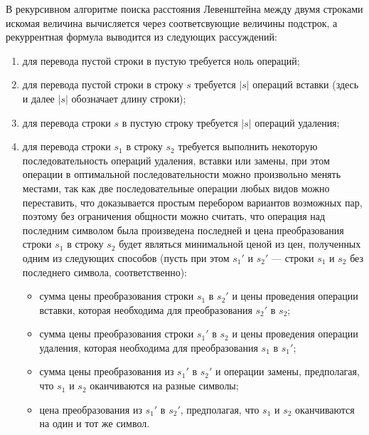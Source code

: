 В рекурсивном алгоритме поиска расстояния Левенштейна между двумя строками
искомая величина вычисляется через соответсвующие величины подстрок, а
рекуррентная формула выводится из следующих рассуждений:
\begin{enumerate}[label=\arabic*)]
    \item для перевода пустой строки в пустую требуется ноль операций; 
    \item для перевода пустой строки в строку $s$ требуется $|s|$ операций
вставки (здесь и далее $|s|$ обозначает длину строки);
    \item для перевода строки $s$ в пустую строку требуется $|s|$ операций
удаления;
    \item для перевода строки $s_1$ в строку $s_2$ требуется выполнить
некоторую последовательность операций удаления, вставки или замены, при этом
операции в оптимальной последовательности можно произвольно менять местами, так
как две последовательные операции любых видов можно переставить, что
доказывается простым перебором вариантов возможных пар, поэтому без ограничения
общности можно считать, что операция над последним символом была произведена
последней и цена преобразования строки $s_1$ в строку $s_2$ будет являться
минимальной ценой из цен, полученных одним из следующих способов (пусть
при этом $s_1'$ и $s_2'$ --- строки $s_1$ и $s_2$ без последнего символа,
соответственно):
        \begin{itemize}[itemindent=\parindent,leftmargin=\parindent]
            \item сумма цены преобразования строки $s_1$ в $s_2'$  и цены
        проведения операции вставки, которая необходима для преобразования $s_2'$
        в $s_2$;
            \item сумма цены преобразования строки $s_1'$ в $s_2$ и цены проведения
        операции удаления, которая необходима для преобразования $s_1$ в $s_1'$;
            \item сумма цены преобразования из $s_1'$ в $s_2'$ и операции замены,
        предполагая, что $s_1$ и $s_2$ оканчиваются на разные символы;
            \item цена преобразования из $s_1'$ в $s_2'$, предполагая, что $s_1$ и
        $s_2$ оканчиваются на один и тот же символ.
        \end{itemize}
\end{enumerate}


